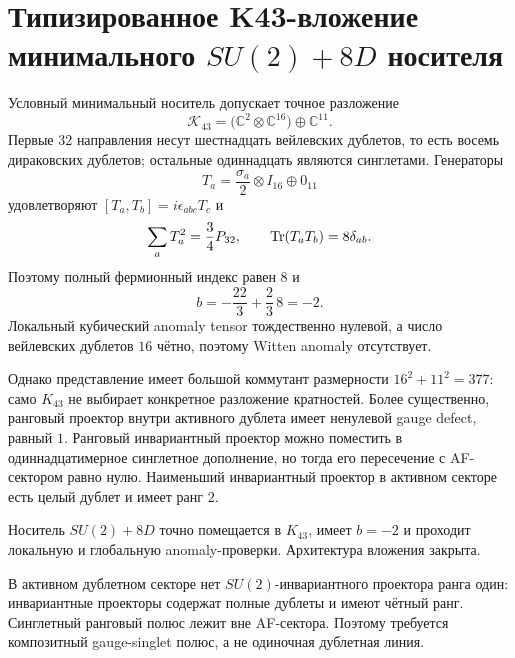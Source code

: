 \chapter{Типизированное K43-вложение минимального
\texorpdfstring{$SU(2)+8D$}{SU(2)+8D} носителя}
\label{ch:v10-discrete-resolution-su2-k43-embedding}

Условный минимальный носитель допускает точное разложение
\begin{equation}
 \mathcal K_{43}
 =\bigl(\mathbb C^2\otimes\mathbb C^{16}\bigr)
 \oplus\mathbb C^{11}.
\end{equation}
Первые $32$ направления несут шестнадцать вейлевских дублетов, то есть
восемь дираковских дублетов; остальные одиннадцать являются синглетами.
Генераторы
\begin{equation}
 T_a=\frac{\sigma_a}{2}\otimes I_{16}\oplus0_{11}
\end{equation}
удовлетворяют $[T_a,T_b]=i\epsilon_{abc}T_c$ и
\begin{equation}
 \sum_aT_a^2=\frac34P_{32},\qquad
 \operatorname{Tr}(T_aT_b)=8\delta_{ab}.
\end{equation}
Поэтому полный фермионный индекс равен $8$ и
\begin{equation}
 b=-\frac{22}{3}+\frac23\,8=-2.
\end{equation}
Локальный кубический anomaly tensor тождественно нулевой, а число
вейлевских дублетов $16$ чётно, поэтому Witten anomaly отсутствует.

Однако представление имеет большой коммутант размерности
$16^2+11^2=377$: само $K_{43}$ не выбирает конкретное разложение
кратностей. Более существенно, ранговый проектор внутри активного дублета
имеет ненулевой gauge defect, равный $1$. Ранговый инвариантный проектор
можно поместить в одиннадцатимерное синглетное дополнение, но тогда его
пересечение с AF-сектором равно нулю. Наименьший инвариантный проектор в
активном секторе есть целый дублет и имеет ранг $2$.

\begin{theorem}
Носитель $SU(2)+8D$ точно помещается в $K_{43}$, имеет $b=-2$ и проходит
локальную и глобальную anomaly-проверки. Архитектура вложения закрыта.
\end{theorem}

\begin{nogocriterion}
В активном дублетном секторе нет $SU(2)$-инвариантного проектора ранга
один: инвариантные проекторы содержат полные дублеты и имеют чётный ранг.
Синглетный ранговый полюс лежит вне AF-сектора. Поэтому требуется
композитный gauge-singlet полюс, а не одиночная дублетная линия.
\end{nogocriterion}

